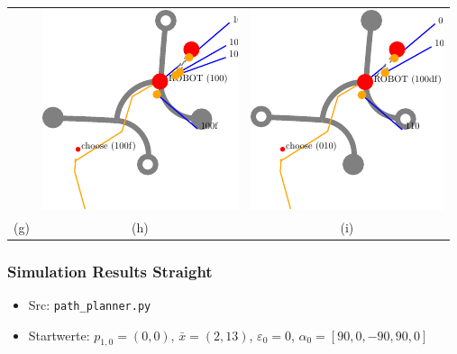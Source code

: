 \documentclass[10pt,a4paper]{article}
\begin{document}
\begin{tabular}{ccc}
&
\includegraphics[scale=.8]{pics/pathplanner_without_noise/example_curve/dec_16.pdf}
&
\includegraphics[scale=.8]{pics/pathplanner_without_noise/example_curve/dec_18.pdf}
\\
(g) & (h) & (i)\\
\end{tabular}

\subsubsection{Simulation Results Straight}

\begin{itemize}
	\item Src: \texttt{path\_planner.py}
	
	\item Startwerte: $p_{1,0} = (0,0)$, $\bar{x} = (2,13)$, $\varepsilon_0 = 0$, $\alpha_0 = [90,0,-90,90,0]$

\end{itemize}
\end{document}
